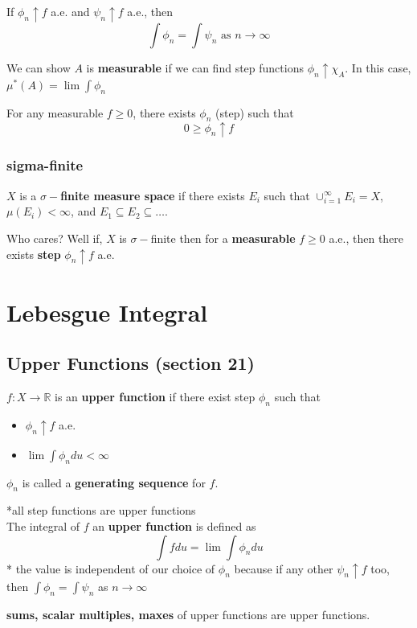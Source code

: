 \documentclass[a4paper, 12pt]{article}
\def\R{\ensuremath{\mathbb{R}}} %
\newcommand{\bt}[1]{\textbf{#1}} %
\begin{document}
\begin{multicols}{2}
    If $\phi_n \uparrow f$ a.e. and $\psi_n \uparrow f$ a.e., then 
    $$\int \phi_n = \int \psi_n \text{ as } n \rightarrow \infty$$

    We can show $A$ is \bt{measurable} if we can find 
    step functions $\phi_n \uparrow \chi_A$. 
    In this case, $\mu^*(A) = \lim \int \phi_n$

    For any measurable $f \geq 0$, there exists $\phi_n$ (step) such that 
    $$ 0 \geq \phi_n \uparrow f$$

    \subsubsection{sigma-finite}
    $X$ is a \bt{$\sigma-$finite measure space} if there exists 
    $E_i$ such that $\cup_{i=1}^\infty E_i = X$, $\mu(E_i) < \infty$, 
    and $E_1 \subseteq E_2 \subseteq \dots$.

    Who cares? Well if, $X$ is $\sigma-$finite then 
    for a \bt{measurable} $f \geq 0$ a.e., then there exists 
    \bt{step} $\phi_n \uparrow f$ a.e.

\section{Lebesgue Integral}


\subsection{Upper Functions (section 21)}

$f: X \rightarrow \R$  is an \bt{upper function} if there exist step $\phi_n$ such that  
\begin{itemize}
    \item $\phi_n \uparrow f$ a.e.
    \item $\lim \int \phi_n du < \infty$
\end{itemize}

$\phi_n$ is called a \bt{generating sequence} for $f$.

*all step functions are upper functions\\

The integral of $f$ an \bt{upper function} is defined as 
$$\int f du = \lim \int \phi_n du$$
* the value is independent of our choice of $\phi_n$ because if any other 
$\psi_n \uparrow f$ too, then $\int \phi_n = \int \psi_n$ as $n \rightarrow \infty$


\bt{sums, scalar multiples, maxes} of upper functions are upper functions.



\end{multicols}
\end{document}
